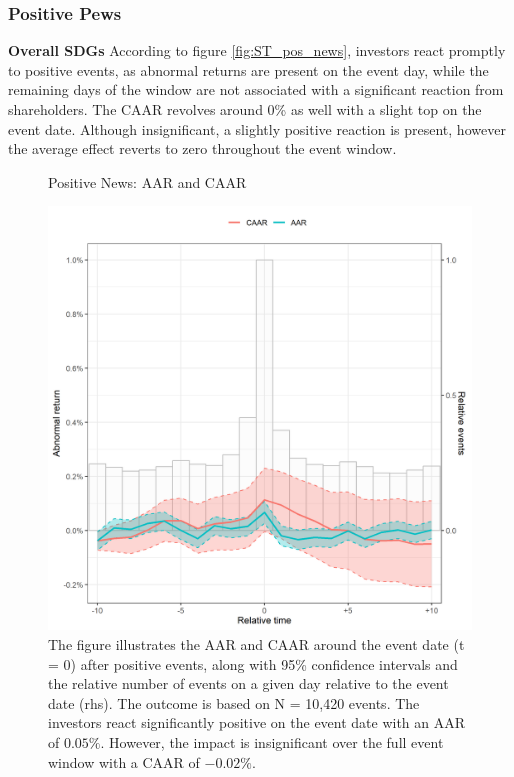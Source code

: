 \subsubsection{Positive Pews}

\textbf{Overall SDGs}
According to figure \ref{fig:ST_pos_news}, investors react promptly to positive events, as abnormal returns are present on the event day, while the remaining days of the window are not associated with a significant reaction from shareholders. The CAAR revolves around 0\% as well with a slight top on the event date. Although insignificant, a slightly positive reaction is present, however the average effect reverts to zero throughout the event window. 

\begin{figure} [h]
     \centering
     \begin{minipage}[t]{0.49\textwidth}
         \centering
    \caption{Positive News: AAR and CAAR \\}
    \includegraphics[width=\textwidth]{Projekt/1.Figures analysis/ST_positive_all_CI.png}
    \caption*{\footnotesize The figure illustrates the AAR and CAAR around the event date (t = 0) after positive events, along with 95\% confidence intervals and the relative number of events on a given day relative to the event date (rhs). The outcome is based on N = 10,420 events. The investors react significantly positive on the event date with an AAR of $0.05\%$. However, the impact is insignificant over the full event window with a CAAR of $-0.02\%$.\\}

\end{minipage}
\end{figure}
